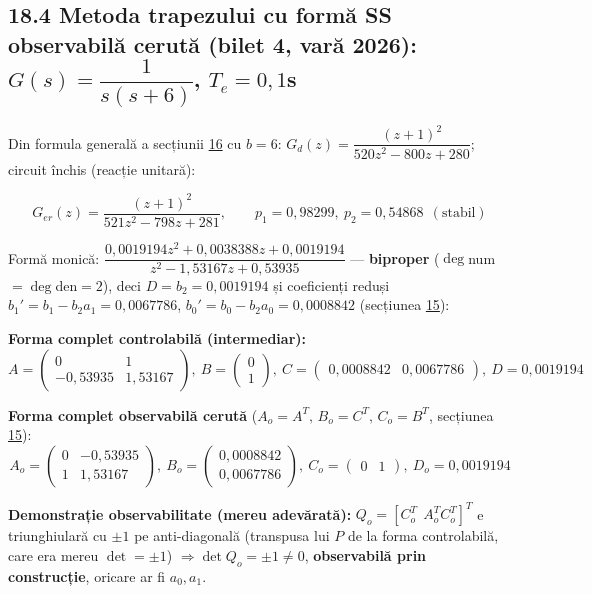 \documentclass[10pt,a4paper]{article}
\begin{document}
\subsection*{18.4 Metoda trapezului cu formă SS observabilă cerută (bilet 4, vară 2026): $G(s)=\dfrac1{s(s+6)}$, $T_e{=}0{,}1$s}
Din formula generală a secțiunii \hyperref[sec:16]{16} cu $b{=}6$: $G_d(z)=\dfrac{(z+1)^2}{520z^2-800z+280}$; circuit închis (reacție unitară):
\begin{keyeq}\color{red!65!black}
$$G_{er}(z)=\dfrac{(z+1)^2}{521z^2-798z+281},\qquad p_1{=}0{,}98299,\ p_2{=}0{,}54868\ \ (\text{stabil})$$
\end{keyeq}
Formă monică: $\dfrac{0{,}0019194z^2+0{,}0038388z+0{,}0019194}{z^2-1{,}53167z+0{,}53935}$ — \textbf{biproper} ($\deg$num$=\deg$den$=2$), deci $D{=}b_2{=}0{,}0019194$ și coeficienți reduși $b_1'=b_1-b_2a_1=0{,}0067786$, $b_0'=b_0-b_2a_0=0{,}0008842$ (secțiunea \hyperref[sec:15]{15}):
\begin{keyeq}\color{red!65!black}
\textbf{Forma complet controlabilă (intermediar):}\quad $A=\begin{pmatrix}0&1\\-0{,}53935&1{,}53167\end{pmatrix},\ B=\begin{pmatrix}0\\1\end{pmatrix},\ C=\begin{pmatrix}0{,}0008842&0{,}0067786\end{pmatrix},\ D=0{,}0019194$

\textbf{Forma complet observabilă cerută} ($A_o{=}A^T,\,B_o{=}C^T,\,C_o{=}B^T$, secțiunea \hyperref[sec:15]{15}):
$$A_o=\begin{pmatrix}0&-0{,}53935\\1&1{,}53167\end{pmatrix},\ B_o=\begin{pmatrix}0{,}0008842\\0{,}0067786\end{pmatrix},\ C_o=\begin{pmatrix}0&1\end{pmatrix},\ D_o=0{,}0019194$$
\end{keyeq}
\textbf{Demonstrație observabilitate (mereu adevărată):} $Q_o=[C_o^T\ \ A_o^TC_o^T]^T$ e triunghiulară cu $\pm1$ pe anti-diagonală (transpusa lui $P$ de la forma controlabilă, care era mereu $\det{=}\pm1$) $\Rightarrow\det Q_o=\pm1\ne0$, \textbf{observabilă prin construcție}, oricare ar fi $a_0,a_1$.
\end{document}
